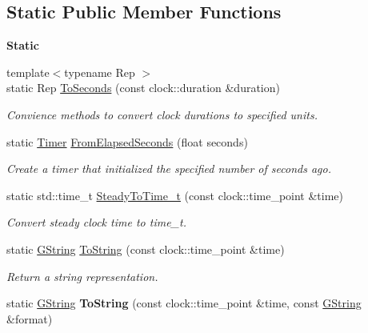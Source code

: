\subsection*{Static Public Member Functions}
\begin{Indent}\textbf{ Static}\par
\begin{DoxyCompactItemize}
\item 
\mbox{\label{classrev_1_1_timer_a9377609fe13e57e878afb45c75ff1b86}} 
{\footnotesize template$<$typename Rep $>$ }\\static Rep \mbox{\hyperlink{classrev_1_1_timer_a9377609fe13e57e878afb45c75ff1b86}{To\+Seconds}} (const clock\+::duration \&duration)
\begin{DoxyCompactList}\small\item\em Convience methods to convert clock durations to specified units. \end{DoxyCompactList}\item 
\mbox{\label{classrev_1_1_timer_ac29cfffb7ddef44f10b6e90d962af40b}} 
static \mbox{\hyperlink{classrev_1_1_timer}{Timer}} \mbox{\hyperlink{classrev_1_1_timer_ac29cfffb7ddef44f10b6e90d962af40b}{From\+Elapsed\+Seconds}} (float seconds)
\begin{DoxyCompactList}\small\item\em Create a timer that initialized the specified number of seconds ago. \end{DoxyCompactList}\item 
\mbox{\label{classrev_1_1_timer_a0c2e82484e41de0984da77a93785983a}} 
static std\+::time\+\_\+t \mbox{\hyperlink{classrev_1_1_timer_a0c2e82484e41de0984da77a93785983a}{Steady\+To\+Time\+\_\+t}} (const clock\+::time\+\_\+point \&time)
\begin{DoxyCompactList}\small\item\em Convert steady clock time to time\+\_\+t. \end{DoxyCompactList}\item 
\mbox{\label{classrev_1_1_timer_aec3cfcc2f0174839512eb5d132195992}} 
static \mbox{\hyperlink{classrev_1_1_g_string}{G\+String}} \mbox{\hyperlink{classrev_1_1_timer_aec3cfcc2f0174839512eb5d132195992}{To\+String}} (const clock\+::time\+\_\+point \&time)
\begin{DoxyCompactList}\small\item\em Return a string representation. \end{DoxyCompactList}\item 
\mbox{\label{classrev_1_1_timer_a3612da7f9e83c708a54f7ce26eb2efad}} 
static \mbox{\hyperlink{classrev_1_1_g_string}{G\+String}} {\bfseries To\+String} (const clock\+::time\+\_\+point \&time, const \mbox{\hyperlink{classrev_1_1_g_string}{G\+String}} \&format)
\end{DoxyCompactItemize}
\end{Indent}



